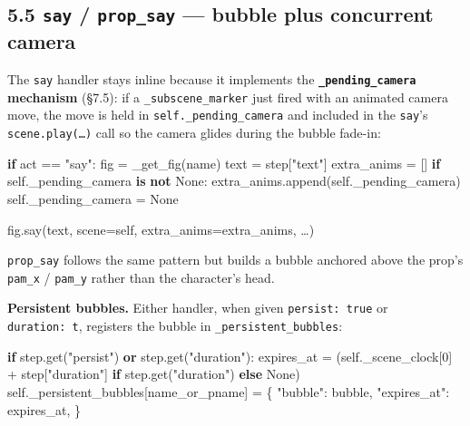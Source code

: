 \documentclass[
  11pt,
]{book}
\newenvironment{Shaded}{}{}
\newcommand{\ControlFlowTok}[1]{\textcolor[rgb]{0.00,0.44,0.13}{\textbf{#1}}}
\newcommand{\DecValTok}[1]{\textcolor[rgb]{0.25,0.63,0.44}{#1}}
\newcommand{\KeywordTok}[1]{\textcolor[rgb]{0.00,0.44,0.13}{\textbf{#1}}}
\newcommand{\NormalTok}[1]{#1}
\newcommand{\OperatorTok}[1]{\textcolor[rgb]{0.40,0.40,0.40}{#1}}
\newcommand{\StringTok}[1]{\textcolor[rgb]{0.25,0.44,0.63}{#1}}
\newcommand{\VariableTok}[1]{\textcolor[rgb]{0.10,0.09,0.49}{#1}}
\begin{document}
\subsection{\texorpdfstring{5.5 \texttt{say} / \texttt{prop\_say} ---
bubble plus concurrent
camera}{5.5 say / prop\_say --- bubble plus concurrent camera}}\label{say-prop_say-bubble-plus-concurrent-camera}

The \texttt{say} handler stays inline because it implements the
\textbf{\texttt{\_pending\_camera} mechanism} (§7.5): if a
\texttt{\_subscene\_marker} just fired with an animated camera move, the
move is held in \texttt{self.\_pending\_camera} and included in the
\texttt{say}'s \texttt{scene.play(…)} call so the camera glides during
the bubble fade-in:

\begin{Shaded}
\begin{Highlighting}[]
\ControlFlowTok{if}\NormalTok{ act }\OperatorTok{==} \StringTok{"say"}\NormalTok{:}
\NormalTok{    fig }\OperatorTok{=}\NormalTok{ \_get\_fig(name)}
\NormalTok{    text }\OperatorTok{=}\NormalTok{ step[}\StringTok{"text"}\NormalTok{]}
\NormalTok{    extra\_anims }\OperatorTok{=}\NormalTok{ []}
    \ControlFlowTok{if} \VariableTok{self}\NormalTok{.\_pending\_camera }\KeywordTok{is} \KeywordTok{not} \VariableTok{None}\NormalTok{:}
\NormalTok{        extra\_anims.append(}\VariableTok{self}\NormalTok{.\_pending\_camera)}
        \VariableTok{self}\NormalTok{.\_pending\_camera }\OperatorTok{=} \VariableTok{None}

\NormalTok{    fig.say(text, scene}\OperatorTok{=}\VariableTok{self}\NormalTok{,}
\NormalTok{            extra\_anims}\OperatorTok{=}\NormalTok{extra\_anims,}
\NormalTok{            …)}
\end{Highlighting}
\end{Shaded}

\texttt{prop\_say} follows the same pattern but builds a bubble anchored
above the prop's \texttt{pam\_x} / \texttt{pam\_y} rather than the
character's head.

\textbf{Persistent bubbles.} Either handler, when given
\texttt{persist:\ true} or \texttt{duration:\ t}, registers the bubble
in \texttt{\_persistent\_bubbles}:

\begin{Shaded}
\begin{Highlighting}[]
\ControlFlowTok{if}\NormalTok{ step.get(}\StringTok{"persist"}\NormalTok{) }\KeywordTok{or}\NormalTok{ step.get(}\StringTok{"duration"}\NormalTok{):}
\NormalTok{    expires\_at }\OperatorTok{=}\NormalTok{ (}\VariableTok{self}\NormalTok{.\_scene\_clock[}\DecValTok{0}\NormalTok{] }\OperatorTok{+}\NormalTok{ step[}\StringTok{"duration"}\NormalTok{]}
                  \ControlFlowTok{if}\NormalTok{ step.get(}\StringTok{"duration"}\NormalTok{) }\ControlFlowTok{else} \VariableTok{None}\NormalTok{)}
    \VariableTok{self}\NormalTok{.\_persistent\_bubbles[name\_or\_pname] }\OperatorTok{=}\NormalTok{ \{}
        \StringTok{"bubble"}\NormalTok{: bubble,}
        \StringTok{"expires\_at"}\NormalTok{: expires\_at,}
\NormalTok{    \}}
\end{Highlighting}
\end{Shaded}
\end{document}
